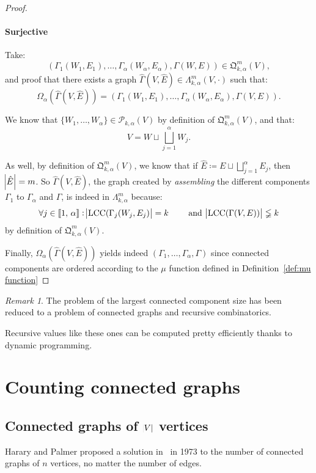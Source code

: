 \documentclass{article}
\theoremstyle{definition}
\theoremstyle{remark}
\newtheorem*{remark}{Remark}
\DeclareMathOperator{\LCC}{LCC}
\newcommand{\intint}[2]{\left\llbracket#1, \, #2\right\rrbracket}
\begin{document}
\begin{proof}
			\paragraph{Surjective} Take:
			\[\left(\Gamma_1(W_1, E_1), \ldots, \Gamma_\alpha(W_\alpha, E_\alpha), \Gamma(W, E)\right) \in \mathfrak Q_{k,\alpha}^m(V),\]
			and proof that there exists a graph $\hat \Gamma(V, \hat E) \in \Lambda_{k,\alpha}^m(V, \cdot)$ such that:
			\[\Omega_\alpha(\hat \Gamma(V, \hat E)) = \left(\Gamma_1(W_1, E_1), \ldots, \Gamma_\alpha(W_\alpha, E_\alpha), \Gamma(V, E)\right).\]

			We know that $\{W_1, \ldots, W_\alpha\} \in \mathcal P_{k,\alpha}(V)$ by definition of $\mathfrak Q_{k,\alpha}^m(V)$, and that:
			\[V = W \sqcup \bigsqcup_{j=1}^\alpha W_j.\]

			As well, by definition of $\mathfrak Q_{k,\alpha}^m(V)$, we know that if $\hat E \coloneqq E \sqcup \bigsqcup_{j=1}^\alpha E_j$, then $\abs {\hat E} = m$.
			So $\hat \Gamma(V, \hat E)$, the graph created by \textit{assembling} the different components $\Gamma_1$ to $\Gamma_\alpha$ and $\Gamma$, is indeed in
			$\Lambda_{k,\alpha}^m$ because:
			\[\forall j \in \intint 1\alpha : \abs {\LCC(\Gamma_j(W_j, E_j)} = k\qquad \text{ and } \abs {\LCC(\Gamma(V, E))} \lneqq k\]
			by definition of $\mathfrak Q_{k,\alpha}^m(V)$.

			Finally, $\Omega_\alpha(\hat \Gamma(V, \hat E))$ yields indeed $(\Gamma_1, \ldots, \Gamma_\alpha, \Gamma)$ since connected components are ordered according
			to the $\mu$ function defined in Definition~\ref{def:mu function}
			\end{proof}

			\begin{remark} The problem of the largest connected component size has been reduced to a problem of connected graphs and recursive combinatorics.

			Recursive values like these ones can be computed pretty efficiently thanks to dynamic programming.
			\end{remark}

\section{Counting connected graphs}
	\subsection{Connected graphs of $\abs V$ vertices}
		Harary and Palmer proposed a solution in~\cite{Harary&Palmer1973} in 1973 to the number of connected graphs of $n$ vertices, no matter the number of edges.
\end{document}
